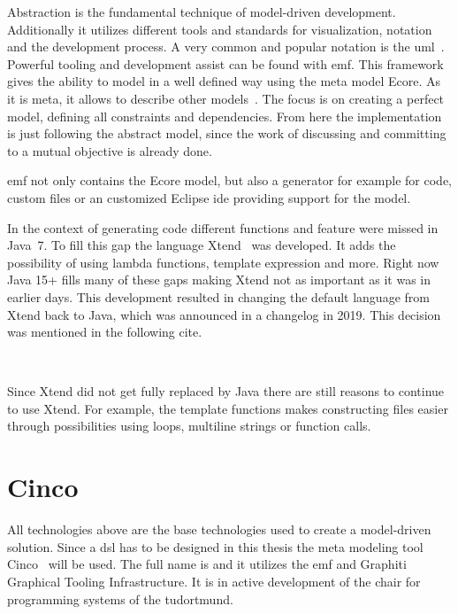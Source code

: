 Abstraction is the fundamental technique of model-driven development. Additionally it utilizes different tools and standards for visualization, notation and the development process. A very common and popular notation is the \gls{uml}~\cite{Cook2017}. Powerful tooling and development assist can be found with \gls{emf}. This framework gives the ability to model in a well defined way using the meta model Ecore. As it is meta, it allows to describe other models~\cite[section 2.3.1]{steinberg2008emf}. The focus is on creating a perfect model, defining all constraints and dependencies. From here the implementation is just following the abstract model, since the work of discussing and committing to a mutual objective is already done.

\gls{emf} not only contains the Ecore model, but also a generator for example for code, custom files or an customized Eclipse \gls{ide} providing support for the model.

In the context of generating code different functions and feature were missed in Java~7. To fill this gap the language Xtend~\cite{xtendhp} was developed. It adds the possibility of using lambda functions,  template expression and more. Right now Java 15+ fills many of these gaps making Xtend not as important as it was in earlier days. This development resulted in changing the default language from Xtend back to Java, which was announced in a changelog in 2019. This decision was mentioned in the following cite.

~\cite{xtendToJava}

Since Xtend did not get fully replaced by Java there are still reasons to continue to use Xtend. For example, the template functions makes constructing files easier through possibilities using loops, multiline strings or function calls.


\section{Cinco}

All technologies above are the base technologies used to create a model-driven solution. Since a \gls{dsl} has to be designed in this thesis the meta modeling tool Cinco~\cite{CincoHomepage} will be used. The full name is  and it utilizes the \gls{emf} and Graphiti Graphical Tooling Infrastructure. It is in active development of the chair for programming systems of the \gls{tudortmund}.

